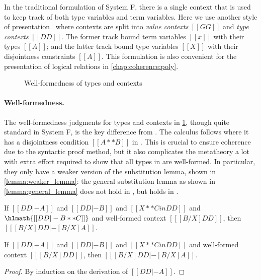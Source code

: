 In the traditional formulation of System F, there is a single context that is
used to keep track of both type variables and term variables. Here we use
another style of presentation~\citep[chap. 16]{Harper_2016} where contexts are
split into \textit{value contexts} $[[GG]]$ and \textit{type contexts} $[[DD]]$.
The former track bound term variables $[[x]]$ with their types $[[A]]$; and the
latter track bound type variables $[[X]]$ with their disjointness constraints
$[[A]]$. This formulation is also convenient for the presentation of logical
relations in \cref{chap:coherence:poly}.

\begin{figure}[t]
  \centering
  \caption{Well-formedness of types and contexts}
  \label{fig:well-formedness:fi}
\end{figure}

\paragraph{Well-formedness.}

The well-formedness judgments for types and contexts in
\cref{fig:well-formedness:fi}, though quite standard in System F, is the key
difference from \fname. The \fname calculus follows \oname where it has a
disjointness condition $[[ A ** B ]]$ in . This is crucial to
ensure coherence due to the syntactic proof method, but it also complicates the
metatheory a lot with extra effort required to show that all types in \fname are
well-formed. In particular, they only have a weaker version of the substitution
lemma, shown in \cref{lemma:weaker_lemma}: the general substitution lemma as
shown in \cref{lemma:general_lemma} does not hold in \fname, but holds in
\fnamee.

\begin{proposition} \label{lemma:weaker_lemma}
  If $[[DD |- A]]$ and $[[DD |- B]]$ and $[[ X ** C in DD  ]]$ and $\hlmath{[[ DD |- B ** C ]]}$
  and well-formed context $[[ [ B / X ] DD    ]]$, then $[[  [ B / X ] DD |- [B / X] A      ]]$.
\end{proposition}

\begin{lemma} \label{lemma:general_lemma}
  If $[[DD |- A]]$ and $[[DD |- B]]$ and $[[ X ** C in DD  ]]$
  and well-formed context $[[ [ B / X ] DD    ]]$, then $[[  [ B / X ] DD |- [B / X] A      ]]$.
\end{lemma}
\begin{proof}
  By induction on the derivation of $[[ DD |- A  ]]$.
\end{proof}


